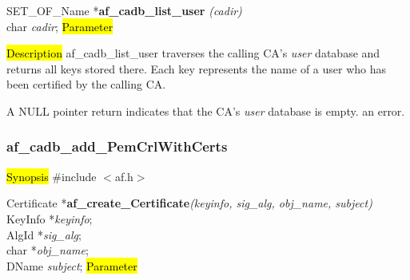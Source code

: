SET\_OF\_Name *{\bf af\_cadb\_list\_user} {\em (cadir)} \\
char {\em *cadir};
\hl{Parameter}

\hl{Description}
af\_cadb\_list\_user traverses the calling CA's {\em user} database and returns all keys
stored there. Each key represents the name of a user who has been certified by the
calling CA.

A NULL pointer return indicates
\bi
\m that the CA's {\em user} database is empty.
\m an error.
\ei




\subsubsection{af\_cadb\_add\_PemCrlWithCerts}
\label{af_make_certificate}
\hl{Synopsis}
\#include $<$af.h$>$

Certificate *{\bf af\_create\_Certificate}{\em (keyinfo, sig\_alg, obj\_name, subject)} \\
KeyInfo *{\em keyinfo}; \\
AlgId *{\em sig\_alg}; \\
char *{\em obj\_name}; \\
DName {\em *subject};
\hl{Parameter}




